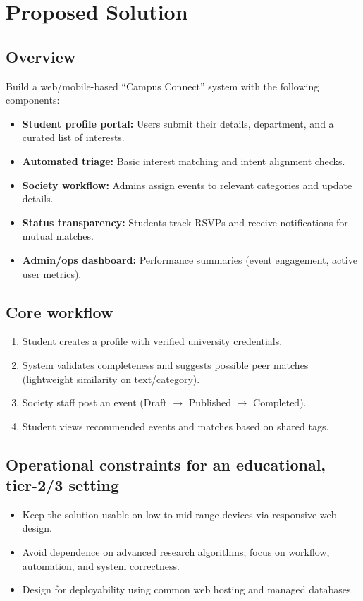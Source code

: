 \documentclass[12pt, a4paper]{article}
\begin{document}
\section{Proposed Solution} 

\subsection{Overview} 
Build a web/mobile-based ``Campus Connect'' system with the following components:
\begin{itemize}
    \item \textbf{Student profile portal:} Users submit their details, department, and a curated list of interests.
    \item \textbf{Automated triage:} Basic interest matching and intent alignment checks.
    \item \textbf{Society workflow:} Admins assign events to relevant categories and update details.
    \item \textbf{Status transparency:} Students track RSVPs and receive notifications for mutual matches.
    \item \textbf{Admin/ops dashboard:} Performance summaries (event engagement, active user metrics).
\end{itemize}

\subsection{Core workflow} 
\begin{enumerate}
    \item Student creates a profile with verified university credentials.
    \item System validates completeness and suggests possible peer matches (lightweight similarity on text/category).
    \item Society staff post an event (Draft $\rightarrow$ Published $\rightarrow$ Completed).
    \item Student views recommended events and matches based on shared tags.
\end{enumerate}

\subsection{Operational constraints for an educational, tier-2/3 setting} 
\begin{itemize}
    \item Keep the solution usable on low-to-mid range devices via responsive web design.
    \item Avoid dependence on advanced research algorithms; focus on workflow, automation, and system correctness.
    \item Design for deployability using common web hosting and managed databases.
\end{itemize}
\end{document}
